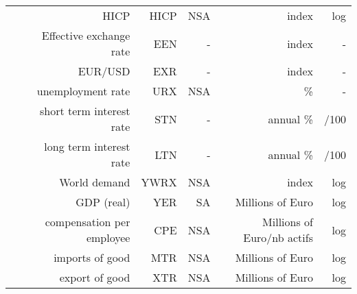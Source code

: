 \documentclass[11pt,a4paper]{article}
\begin{document}
\begin{table}[htbp]
{\begin{tabular}{rrrrrr}
      \\
    \multicolumn{1}{c}{} &
      HICP &
      HICP &
      NSA &
      index &
      log
      \\
    \multicolumn{1}{c}{} &
      Effective exchange rate &
      EEN &
      - &
      index &
      -
      \\
    \multicolumn{1}{c}{} &
      EUR/USD &
      EXR &
      - &
      index &
      -
      \\
    \multicolumn{1}{c}{} &
      unemployment rate &
      URX &
      NSA &
      \% &
      -
      \\
    \multicolumn{1}{c}{} &
      short term interest rate &
      STN &
      - &
      annual \% &
      /100
      \\
    \multicolumn{1}{c}{} &
      long term interest rate &
      LTN &
      - &
      annual \% &
      /100
      \\
    \multicolumn{1}{c}{} &
      World demand &
      YWRX &
      NSA &
      index &
      log
      \\
    \multicolumn{1}{c}{} &
      GDP (real) &
      YER &
      SA &
      Millions of Euro &
      log
      \\
    \multicolumn{1}{c}{} &
      compensation per employee &
      CPE &
      NSA &
      Millions of Euro/nb actifs &
      log
      \\
    \multicolumn{1}{c}{} &
      imports of good &
      MTR &
      NSA &
      Millions of Euro &
      log
      \\
    \multicolumn{1}{c}{} &
      export of good &
      XTR &
      NSA &
      Millions of Euro &
      log
      \\
    \bottomrule
    \end{tabular}

  \label{tab:addlabel}
}
\end{table}
\end{document}
